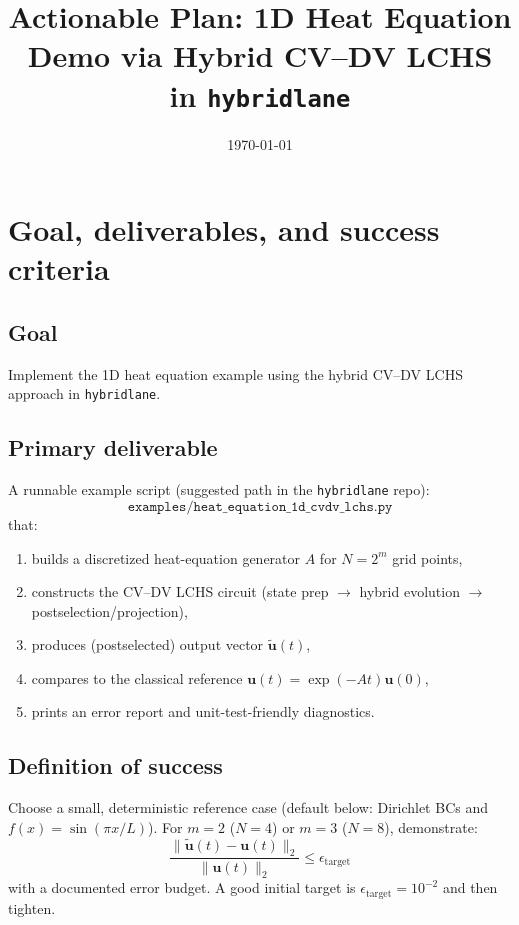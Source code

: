 \documentclass[11pt]{article}
\title{Actionable Plan: 1D Heat Equation Demo via Hybrid CV--DV LCHS\\
in \texttt{hybridlane}}
\author{}
\date{\today}
\begin{document}
\maketitle

\section{Goal, deliverables, and success criteria}

\subsection*{Goal}
Implement the 1D heat equation example using the hybrid CV--DV LCHS approach in \texttt{hybridlane}.

\subsection*{Primary deliverable}
A runnable example script (suggested path in the \texttt{hybridlane} repo):
\[
\texttt{examples/heat\_equation\_1d\_cvdv\_lchs.py}
\]
that:
\begin{enumerate}[itemsep=2pt,topsep=2pt]
\item builds a discretized heat-equation generator $A$ for $N=2^m$ grid points,
\item constructs the CV--DV LCHS circuit (state prep $\rightarrow$ hybrid evolution $\rightarrow$ postselection/projection),
\item produces (postselected) output vector $\tilde{\mathbf u}(t)$,
\item compares to the classical reference $\mathbf u(t)=\exp(-At)\mathbf u(0)$,
\item prints an error report and unit-test-friendly diagnostics.
\end{enumerate}

\subsection*{Definition of success}
Choose a small, deterministic reference case (default below: Dirichlet BCs and $f(x)=\sin(\pi x/L)$). For $m=2$ ($N=4$) or $m=3$ ($N=8$), demonstrate:
\[
\frac{\|\tilde{\mathbf u}(t)-\mathbf u(t)\|_2}{\|\mathbf u(t)\|_2} \le \epsilon_{\mathrm{target}}
\]
with a documented error budget. A good initial target is $\epsilon_{\mathrm{target}}=10^{-2}$ and then tighten.
\end{document}
